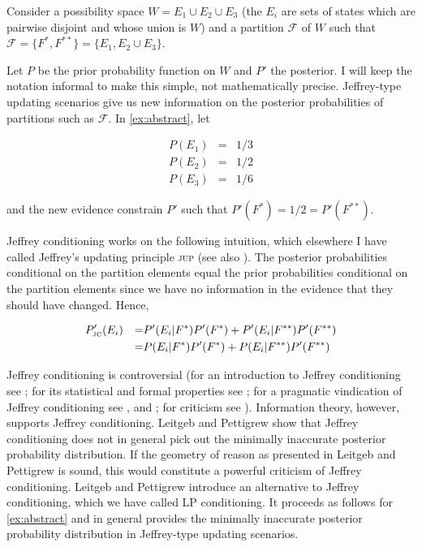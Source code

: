 \documentclass[phd,12pt,oneside]{ubcthesis}
\begin{document}
\begin{quotex}
  \label{ex:abstract} Consider a possibility
  space $W=E_{1}\cup{}E_{2}\cup{}E_{3}$ (the $E_{i}$ are sets of
  states which are pairwise disjoint and whose union is $W$) and a
  partition $\mathcal{F}$ of $W$ such that
  $\mathcal{F}=\{F^{*},F^{**}\}=\{E_{1},E_{2}\cup{}E_{3}\}$.
\end{quotex}

Let $P$ be the prior probability function on $W$ and $P'$ the
posterior. I will keep the notation informal to make this simple, not
mathematically precise. Jeffrey-type updating scenarios give us new
information on the posterior probabilities of partitions such as
$\mathcal{F}$. In {\xample} \ref{ex:abstract}, let

\begin{equation}
  \label{eq:priors}
  \begin{array}{rcl}
    P(E_{1})&=&1/3 \\
    P(E_{2})&=&1/2 \\
    P(E_{3})&=&1/6
  \end{array}
\end{equation}

{\noindent}and the new evidence constrain $P'$ such that
$P'(F^{*})=1/2=P'(F^{**})$.

Jeffrey conditioning works on the following intuition, which elsewhere
I have called Jeffrey's updating principle \textsc{jup} (see also
). The posterior probabilities
conditional on the partition elements equal the prior probabilities
conditional on the partition elements since we have no information in
the evidence that they should have changed. Hence,

\begin{align}
  \label{eq:jc}
  &P'_{\mbox{\tiny JC}}(E_{i})&=&P'(E_{i}|F^{*})P'(F^{*})+P'(E_{i}|F^{**})P'(F^{**})\notag \\
  &&=&P(E_{i}|F^{*})P'(F^{*})+P(E_{i}|F^{**})P'(F^{**})
\end{align}

Jeffrey conditioning is controversial (for an introduction to Jeffrey
conditioning see ; for its statistical and
formal properties see ; for a pragmatic
vindication of Jeffrey conditioning see , and
; for criticism see
). Information theory, however, supports
Jeffrey conditioning. Leitgeb and Pettigrew show that Jeffrey
conditioning does not in general pick out the minimally inaccurate
posterior probability distribution. If the geometry of reason as
presented in Leitgeb and Pettigrew is sound, this would constitute a
powerful criticism of Jeffrey conditioning. Leitgeb and Pettigrew
introduce an alternative to Jeffrey conditioning, which we have called
LP conditioning. It proceeds as follows for {\xample} \ref{ex:abstract}
and in general provides the minimally inaccurate posterior probability
distribution in Jeffrey-type updating scenarios.
\end{document}
